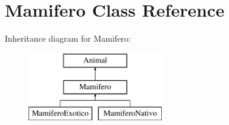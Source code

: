 \hypertarget{class_mamifero}{}\section{Mamifero Class Reference}
\label{class_mamifero}
Inheritance diagram for Mamifero\+:\begin{figure}[H]
\begin{center}
\leavevmode
\includegraphics[height=3.000000cm]{class_mamifero}
\end{center}
\end{figure}
